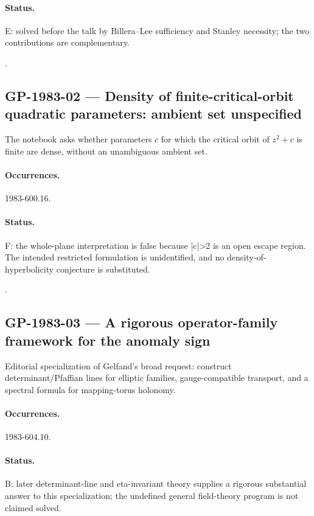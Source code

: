 \paragraph{Status.} E: solved before the talk by Billera--Lee sufficiency and Stanley necessity; the two contributions are complementary.

\noindent\citep{stanley1980faces,stanley1984lefschetz}.

\subsection{GP-1983-02 --- Density of finite-critical-orbit quadratic parameters: ambient set unspecified}

\label{problem:GP-1983-02}

The notebook asks whether parameters \(c\) for which the critical orbit of \(z^2+c\) is finite are dense, without an unambiguous ambient set.

\paragraph{Occurrences.} 1983-600.16.

\paragraph{Status.} F: the whole-plane interpretation is false because |c|>2 is an open escape region. The intended restricted formulation is unidentified, and no density-of-hyperbolicity conjecture is substituted.

\noindent\citep{douadyhubbard1985polynomes}.

\subsection{GP-1983-03 --- A rigorous operator-family framework for the anomaly sign}

\label{problem:GP-1983-03}

Editorial specialization of Gelfand's broad request: construct determinant/Pfaffian lines for elliptic families, gauge-compatible transport, and a spectral formula for mapping-torus holonomy.

\paragraph{Occurrences.} 1983-604.10.

\paragraph{Status.} B: later determinant-line and eta-invariant theory supplies a rigorous substantial answer to this specialization; the undefined general field-theory program is not claimed solved.

